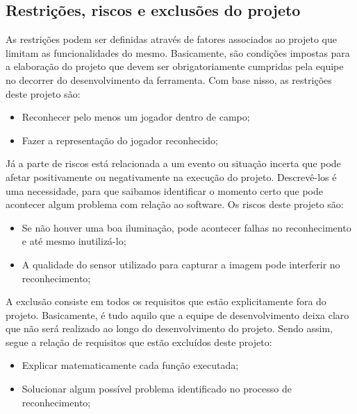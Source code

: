 \subsection{Restrições, riscos e exclusões do projeto}

As restrições podem ser definidas através de fatores associados ao projeto que limitam as funcionalidades do mesmo. Basicamente, são condições impostas para a elaboração do projeto que devem ser obrigatoriamente cumpridas pela equipe no decorrer do desenvolvimento da ferramenta. Com base nisso, as restrições deste projeto são:

\begin{itemize}
\raggedright \item Reconhecer pelo menos um jogador dentro de campo;
\raggedright \item Fazer a representação do jogador reconhecido;
\end{itemize}

Já a parte de riscos está relacionada a um evento ou situação incerta que pode afetar positivamente ou negativamente na execução do projeto. Descrevê-los é uma necessidade, para que saibamos identificar o momento certo que pode acontecer algum problema com relação ao software. Os riscos deste projeto são:

\begin{itemize}
\raggedright \item Se não houver uma boa iluminação, pode acontecer falhas no reconhecimento e até mesmo inutilizá-lo;
\raggedright \item A qualidade do sensor utilizado para capturar a imagem pode interferir no reconhecimento;
\end{itemize}

A exclusão consiste em todos os requisitos que estão explicitamente fora do projeto. Basicamente, é tudo aquilo que a equipe de desenvolvimento deixa claro que não será realizado ao longo do desenvolvimento do projeto. Sendo assim, segue a relação de requisitos que estão excluídos deste projeto:

\begin{itemize}
\raggedright \item Explicar matematicamente cada função executada;
\raggedright \item Solucionar algum possível problema identificado no processo de reconhecimento;
\end{itemize}